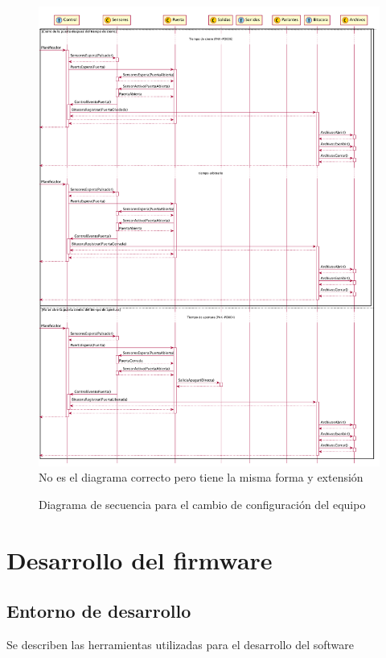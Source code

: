 \begin{figure}[ht]
	\centering
	\includegraphics[width=\textwidth]{Figures/PNK-DS002-B.pdf}
	{\color{red} No es el diagrama correcto pero tiene la misma forma y extensión}
	\caption{Diagrama de secuencia para el cambio de configuración del equipo}
	\label{fig:SecuenciaConfiguracion}
\end{figure}

\FloatBarrier

\section{Desarrollo del firmware}
\label{sec:desarrollo}

\subsection{Entorno de desarrollo}

Se describen las herramientas utilizadas para el desarrollo del software

